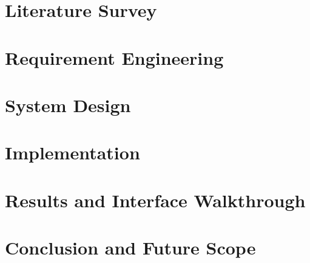 \documentclass[a4paper, 12pt, oneside]{report}
\begin{document}
\chapter{Literature Survey}


\chapter{Requirement Engineering}


\chapter{System Design}


\chapter{Implementation}


\chapter{Results and Interface Walkthrough}
\label{ch:results}


\chapter{Conclusion and Future Scope}




\end{document}
